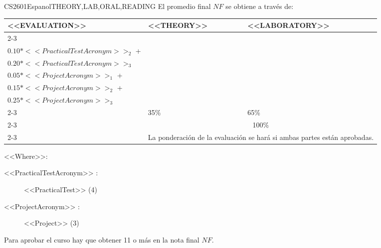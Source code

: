     
\begin{evaluation}{CS2601}{Espanol}{THEORY,LAB,ORAL,READING}
  El promedio final $NF$ se obtiene a través de:
 
  \begin{tabularx}{0.9\textwidth}{|X|p{}|p{}|} \hline
  \multirow{4}{*}{\uppercase{<<Evaluation>>}} & \uppercase{<<Theory>>} & \uppercase{<<Laboratory>>} \\ \cline{2-3}
  & %
      \begin{minipage}{0.95\textwidth}
      \begin{tabular}{l}
          $0.05*<<PracticalTestAcronym>>_{1}$  + \\
          $0.10*<<PracticalTestAcronym>>_{2}$  + \\
          $0.20*<<PracticalTestAcronym>>_{3}$
      \end{tabular} 
      \end{minipage} 
  & %
      \begin{minipage}{0.95\textwidth}
      \begin{tabular}{l}
          $0.20*<<PracticalTestAcronym>>_{4}$  + \\
          $0.05*<<ProjectAcronym>>_{1}$  + \\
          $0.15*<<ProjectAcronym>>_{2}$  + \\
          $0.25*<<ProjectAcronym>>_{3}$
      \end{tabular} 
      \end{minipage}                 \\ \cline{2-3}
  
  & %
  35\% 
  & %
  65\% \\ \cline{2-3}
  & \multicolumn{2}{|c|}{100\%}  \\ \cline{2-3}
  & \multicolumn{2}{|c|}{La ponderación de la evaluación se hará si ambas partes están aprobadas.}  \\ \hline
  \end{tabularx}
    
  \vspace{2mm}
  \noindent <<Where>>:
  \begin{description}
      \item[<<PracticalTestAcronym>> :] <<PracticalTest>>  (4)
      \item[<<ProjectAcronym>> :] <<Project>> (3)
  \end{description}
  
  \noindent Para aprobar el curso hay que obtener 11 o más en la nota final $NF$.
  \end{evaluation}
 
